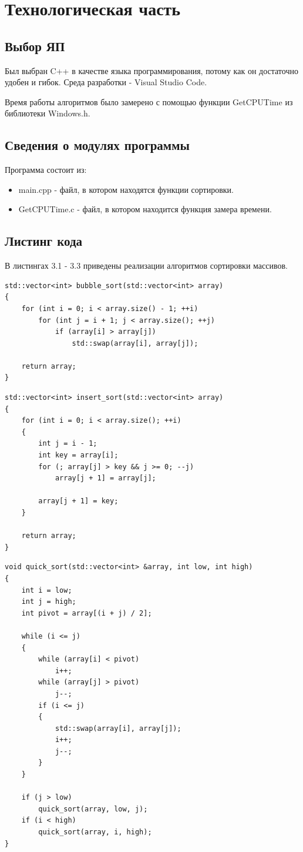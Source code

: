 \documentclass[12pt]{report}
\begin{document}
\chapter{Технологическая часть}
\section{Выбор ЯП}
Был  выбран C++ в качестве языка программирования, потому как он достаточно удобен и гибок. Среда разработки - Visual Studio Code.

Время работы алгоритмов было замерено с помощью функции GetCPUTime из библиотеки Windows.h.

\section{Сведения о модулях программы}
Программа состоит из:
\begin{itemize}
	\item main.cpp - файл, в котором находятся функции сортировки.
	\item GetCPUTime.c - файл, в котором находится функция замера времени.
\end{itemize}

\section{Листинг кода}
В листингах 3.1 - 3.3 приведены реализации алгоритмов сортировки массивов.
\newpage
\begin{lstlisting}[label = some-code, caption = Сортировка пузырьком]
std::vector<int> bubble_sort(std::vector<int> array)
{
	for (int i = 0; i < array.size() - 1; ++i)
		for (int j = i + 1; j < array.size(); ++j)
			if (array[i] > array[j])
				std::swap(array[i], array[j]);

	return array;
}

\end{lstlisting}

\begin{lstlisting}[label = some-code, caption = Сортировка вставками]
std::vector<int> insert_sort(std::vector<int> array)
{
	for (int i = 0; i < array.size(); ++i)
	{
		int j = i - 1;
		int key = array[i];
		for (; array[j] > key && j >= 0; --j)
			array[j + 1] = array[j];

		array[j + 1] = key;
	}

	return array;
}
\end{lstlisting}
\newpage
\begin{lstlisting}[label=some-code,caption=Быстрая сортировка]
void quick_sort(std::vector<int> &array, int low, int high)
{
	int i = low;
	int j = high;
	int pivot = array[(i + j) / 2];

	while (i <= j)
	{
		while (array[i] < pivot)
			i++;
		while (array[j] > pivot)
			j--;
		if (i <= j)
		{
			std::swap(array[i], array[j]);
			i++;
			j--;
		}
	}

	if (j > low)
		quick_sort(array, low, j);
	if (i < high)
		quick_sort(array, i, high);
}
\end{lstlisting}
\end{document}
